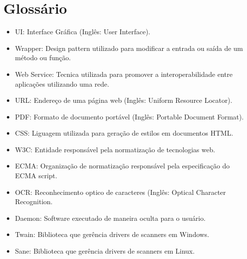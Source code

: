 \section{Glossário}
\label{sec:glossario}

\begin{itemize}
\item UI: Interface Gráfica (Inglês: User Interface).
\item Wrapper: Design pattern utilizado para modificar a entrada ou saída 
de um método ou função.
\item Web Service: Tecnica utilizada para promover a interoperabilidade entre aplicações utilizando uma rede.
\item URL: Endereço de uma página web (Inglês: Uniform Resource Locator).
\item PDF: Formato de documento portável (Inglês: Portable Document Format).
\item CSS: Liguagem utilizada para geração de estilos em documentos HTML.
\item W3C: Entidade responsável pela normatização de tecnologias web.
\item ECMA: Organização de normatização responsável pela especificação do ECMA script.
\item OCR: Reconhecimento optico de caracteres (Inglês: Optical Character Recognition.
\item Daemon: Software executado de maneira oculta para o usuário.
\item Twain: Biblioteca que gerência drivers de scanners em Windows.
\item Sane: Biblioteca que gerência drivers de scanners em Linux.
\end{itemize}
